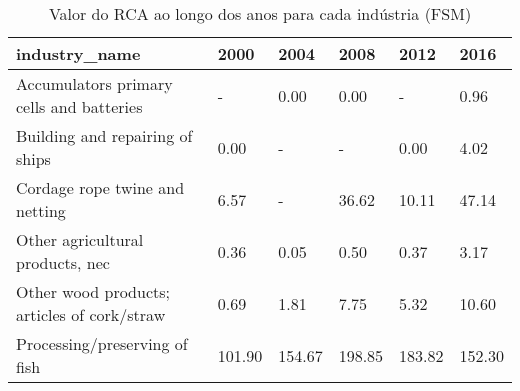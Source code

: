 \begin{table}
\centering
\caption{Valor do RCA ao longo dos anos para cada indústria (FSM)}
\begin{tabular}{p{6cm}p{1.5cm}p{1.5cm}p{1.5cm}p{1.5cm}p{1.5cm}}
\toprule
                              industry\_name &   2000 &   2004 &   2008 &   2012 &   2016 \\
\midrule
   Accumulators primary cells and batteries &      - &   0.00 &   0.00 &      - &   0.96 \\
            Building and repairing of ships &   0.00 &      - &      - &   0.00 &   4.02 \\
             Cordage rope twine and netting &   6.57 &      - &  36.62 &  10.11 &  47.14 \\
           Other agricultural products, nec &   0.36 &   0.05 &   0.50 &   0.37 &   3.17 \\
Other wood products; articles of cork/straw &   0.69 &   1.81 &   7.75 &   5.32 &  10.60 \\
              Processing/preserving of fish & 101.90 & 154.67 & 198.85 & 183.82 & 152.30 \\
\bottomrule
\end{tabular}
\end{table}
